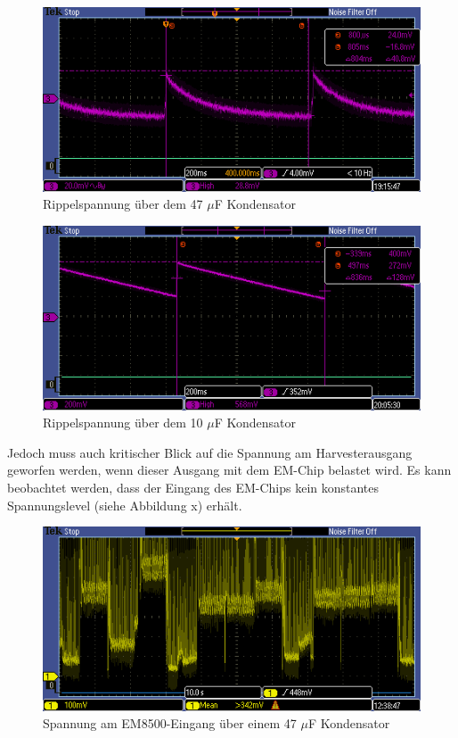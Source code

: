 \begin{figure}[ht]
    \includegraphics{3Vorgehen/imag/47uF_mit_Limiter_AC.PNG}
    \caption{Rippelspannung über dem 47 $\mu$F Kondensator}
	\label{47uF_mit_Limiter_AC} 
\end{figure}

\begin{figure}[ht]
    \includegraphics{3Vorgehen/imag/10uF_mit_Limiter_DC.PNG}
    \caption{Rippelspannung über dem 10 $\mu$F Kondensator}
	\label{10uF_mit_Limiter_DC} 
\end{figure}

Jedoch muss auch kritischer Blick auf die Spannung am Harvesterausgang geworfen werden, wenn dieser Ausgang mit dem EM-Chip belastet wird. Es kann beobachtet werden, dass der Eingang des EM-Chips kein konstantes Spannungslevel (siehe Abbildung x) erhält. 

\begin{figure}[ht]
    \includegraphics{3Vorgehen/imag/VCC_47uF_15kmh_Periode.PNG}
    \caption{Spannung am EM8500-Eingang über einem 47 $\mu$F Kondensator}
	\label{VCC_47uF_15kmh_Periode} 
\end{figure}

